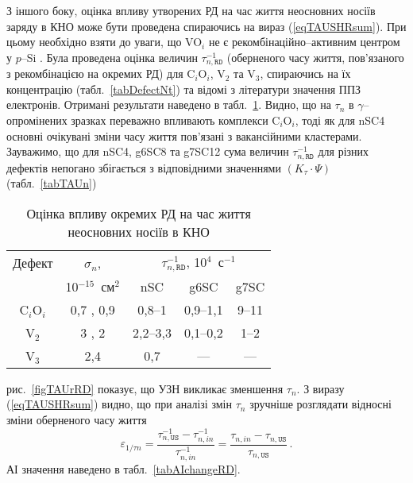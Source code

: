 З іншого боку,
оцінка впливу утворених РД на час життя неосновних носіїв заряду в КНО може бути проведена спираючись
на вираз (\ref{eqTAUSHRsum}).
При цьому необхідно взяти до уваги,
що VO$_i$ не є рекомбінаційно--активним центром у $p$--Si \cite{gamma:Kolkov,IrrCzpSi:Benton,IrrCzpSi:Coffa,IrrCzpSi:Ganagona,IrrCzpSi:Vines}.
Була проведена оцінка величин $\tau_{n,\mathtt{RD}}^{-1}$ (оберненого часу життя, пов'язаного з рекомбінацією на окремих РД)
для C$_i$O$_i$, V$_2$ та  V$_3$, спираючись на їх концентрацію (табл.~\ref{tabDefectNt}) та відомі з літератури значення ППЗ електронів.
Отримані результати наведено в табл.~\ref{tabDefectTAU}.
Видно, що на $\tau_n$ в $\gamma$--опромінених зразках переважно впливають комплекси C$_i$O$_i$, тоді як для nSC4 основні очікувані
зміни часу життя пов'язані з вакансійними кластерами.
Зауважимо, що для nSC4, g6SC8 та g7SC12 сума величин $\tau_{n,\mathtt{RD}}^{-1}$ для різних дефектів
непогано збігається з відповідними значеннями $(K_\tau\cdot\Psi)$ (табл.~\ref{tabTAUn})




\begin{table}[b]
\caption{\label{tabDefectTAU}Оцінка впливу окремих РД на час життя неосновних носіїв в КНО
}
\center
\begin{tabular}{|c|c|c|c|c|}
\hline
Дефект&$\sigma_n$,&\multicolumn{3}{c|}{$\tau_{n,\mathtt{RD}}^{-1}$, 10$^4$~с$^{-1}$}\\ \cline{3-5}
&10$^{-15}$~см$^2$&nSC&g6SC&g7SC\\
\hline
C$_i$O$_i$&0,7 \cite{gamma:Stahl}, 0,9 \cite{gamma:Kolkr}&0,8--1&0,9--1,1&9--11\\ \hline
V$_2$&3 \cite{gamma:Stahl}, 2 \cite{A:Brothe}&2,2--3,3&0,1--0,2&1--2\\ \hline
V$_3$&2,4 \cite{V3:Markevich}&0,7&---&---\\ \hline
\end{tabular}
\end{table}

рис.~\ref{figTAUrRD} показує, що УЗН викликає зменшення $\tau_n$.
З виразу (\ref{eqTAUSHRsum}) видно, що при аналізі змін $\tau_n$
зручніше розглядати відносні зміни оберненого часу життя
\begin{equation*}
  \varepsilon_{1/\tau n}=\frac{\tau_{n,\mathtt{US}}^{-1}-\tau_{n,in}^{-1}}{\tau_{n,in}^{-1}}=\frac{\tau_{n,in}-\tau_{n,\mathtt{US}}}{\tau_{n,\mathtt{US}}}\,.
\end{equation*}
АІ значення наведено в табл.~\ref{tabAIchangeRD}.

